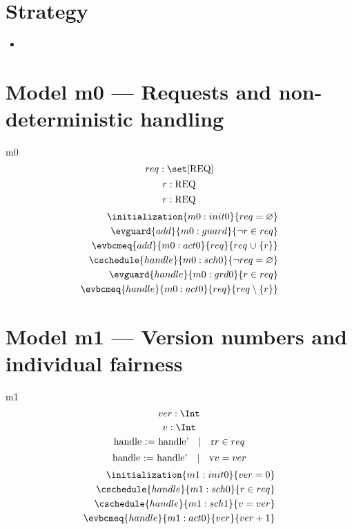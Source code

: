 \documentclass[12pt]{amsart}
\newcommand{\REQ}{\text{REQ}}
\begin{document}
\section{Strategy}

\begin{itemize}
  \item 
\end{itemize}
\section{Model m0 --- Requests and non-deterministic handling}
\begin{machine}{m0}
  \newset{\REQ}
  \[ \variable{ req : \set [\REQ] } \]
  \[ \param{add}{ r : \REQ } \]
  \[ \param{handle}{ r : \REQ } \]
  \begin{align*}
      \initialization{m0:init0}{ req = \emptyset } \\
      \evguard{add}{m0:guard}{ \neg r \in req } \\
      \evbcmeq{add}{m0:act0}{req}{ req \bunion \{ r \} } \\
      \cschedule{handle}{m0:sch0}{ \neg req = \emptyset } \\
      \evguard{handle}{m0:grd0}{ r \in req } \\
      \evbcmeq{handle}{m0:act0}{req}{ req \setminus \{ r \} } 
  \end{align*}

\noindent
\end{machine}
\section{Model m1 --- Version numbers and individual fairness}
\begin{machine}{m1}
  \[ \variable{ ver : \Int } \]
  \[ \indices{handle}{ v : \Int } \]
  \[\witness{handle}{r}{r \in req}\]
  \[\witness{handle}{v}{v = ver}\]
  \begin{align}
      \initialization{m1:init0}{ ver = 0 } \\
      \cschedule{handle}{m1:sch0}{ r \in req } \\
      \cschedule{handle}{m1:sch1}{ v = ver } \\
      \evbcmeq{handle}{m1:act0}{ver}{ ver + 1 } 
  \end{align}
\end{machine}
\end{document}
